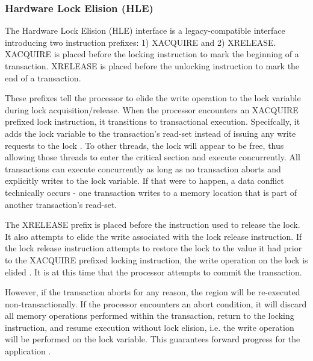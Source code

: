 \documentclass[a4paper]{article}
\begin{document}
\subsubsection{\textbf{Hardware Lock Elision (HLE)}}

\indent 
The Hardware Lock Elision (HLE) interface is a legacy-compatible
interface introducing two instruction prefixes: 1) XACQUIRE and 2) XRELEASE.
XACQUIRE is placed before the locking instruction to mark the beginning of a
transaction.  XRELEASE is placed before the unlocking instruction to mark the
end of a transaction.
\par

\indent 
These prefixes tell the processor to elide the write operation to the lock
variable during lock acquisition/release.  When the processor encounters an
XACQUIRE prefixed lock instruction, it transitions to transactional execution.
Specifcally, it adds the lock variable to the transaction's read-set instead of
issuing any write requests to the lock \cite{intel_prog_ref}.  To other threads,
the lock will appear to be free, thus allowing those threads to enter the
critical section and execute concurrently.  All transactions can execute
concurrently as long as no transaction aborts and explicitly writes to the lock
variable.  If that were to happen, a data conflict technically occurs - one
transaction writes to a memory location that is part of another transaction's
read-set.
\par

\indent 
The XRELEASE prefix is placed before the instruction used to release the
lock.  It also attempts to elide the write associated with the lock release
instruction.  If the lock release instruction attempts to restore the lock to the
value it had prior to the XACQUIRE prefixed locking instruction, the write
operation on the lock is elided \cite{intel_prog_ref}.  It is at this time that
the processor attempts to commit the transaction.
\par

\indent 
However, if the transaction aborts for any reason, the region will be
re-executed non-transactionally.  If the processor encounters an abort
condition, it will discard all memory operations performed within the
transaction, return to the locking instruction, and resume execution without
lock elision, i.e. the write operation will be performed on the lock variable.
This guarantees forward progress for the application \cite{intel_prog_ref}.
\par
\end{document}
